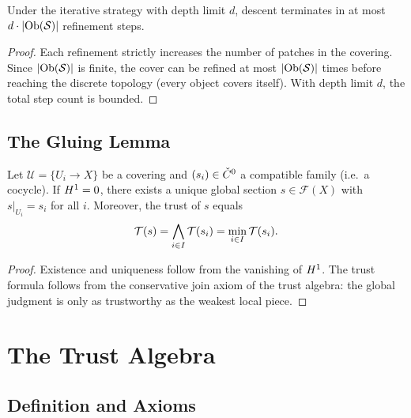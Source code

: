 \begin{theorem}\label{thm:termination}
Under the iterative strategy with depth limit $d$, descent terminates
in at most $d \cdot |\mathrm{Ob}(\mathcal{S})|$ refinement steps.
\end{theorem}

\begin{proof}
Each refinement strictly increases the number of patches in the covering.
Since $|\mathrm{Ob}(\mathcal{S})|$ is finite, the cover can be refined at most
$|\mathrm{Ob}(\mathcal{S})|$ times before reaching the discrete topology (every object
covers itself).  With depth limit $d$, the total step count is bounded.
\end{proof}

\subsection{The Gluing Lemma}\label{subsec:gluing}

\begin{lemma}[Gluing]\label{lem:gluing}
Let $\mathcal{U} = \{U_i \to X\}$ be a covering and $(s_i) \in \check{C}^0$
a compatible family (i.e.\ a cocycle).  If $H^{1} = 0$, there exists
a unique global section $s \in \mathcal{F}(X)$ with $s|_{U_i} = s_i$ for
all $i$.  Moreover, the trust of $s$ equals
\[
  \mathcal{T}(s) = \bigwedge_{i \in I} \mathcal{T}(s_i) = \min_{i \in I} \mathcal{T}(s_i).
\]
\end{lemma}

\begin{proof}
Existence and uniqueness follow from the vanishing of $H^{1}$.  The
trust formula follows from the conservative join axiom of the trust algebra:
the global judgment is only as trustworthy as the weakest local piece.
\end{proof}

\section{The Trust Algebra}\label{sec:trust}

\subsection{Definition and Axioms}

